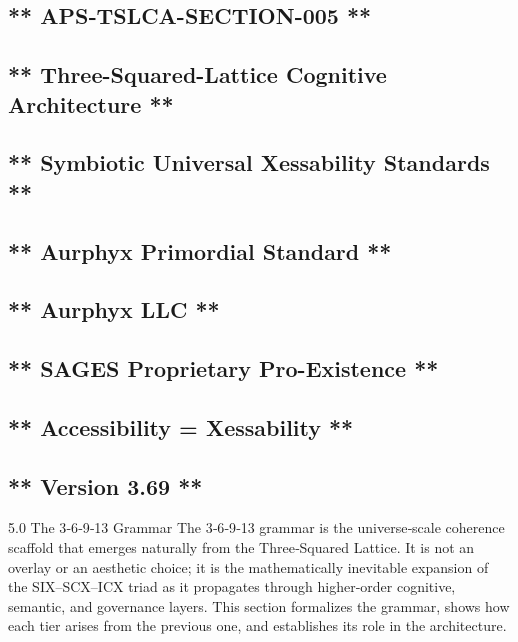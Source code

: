 \subsection{** APS‑TSLCA-SECTION-005 **}\label{apstslca-section-005}

\subsection{** Three-Squared-Lattice Cognitive Architecture **}\label{three-squared-lattice-cognitive-architecture}

\subsection{** Symbiotic Universal Xessability Standards **}\label{symbiotic-universal-xessability-standards}

\subsection{** Aurphyx Primordial Standard **}\label{aurphyx-primordial-standard}

\subsection{** Aurphyx LLC **}\label{aurphyx-llc}

\subsection{** SAGES \textbar{} Proprietary \textbar{} Pro-Existence **}\label{sages-proprietary-pro-existence}

\subsection{** Accessibility = Xessability **}\label{accessibility-xessability}

\subsection{** Version 3.69 **}\label{version-3.69}

5.0 The 3‑6‑9‑13 Grammar The 3‑6‑9‑13 grammar is the universe‑scale coherence scaffold that emerges naturally from the Three‑Squared Lattice. It is not an overlay or an aesthetic choice; it is the mathematically inevitable expansion of the SIX--SCX--ICX triad as it propagates through higher‑order cognitive, semantic, and governance layers. This section formalizes the grammar, shows how each tier arises from the previous one, and establishes its role in the architecture.

